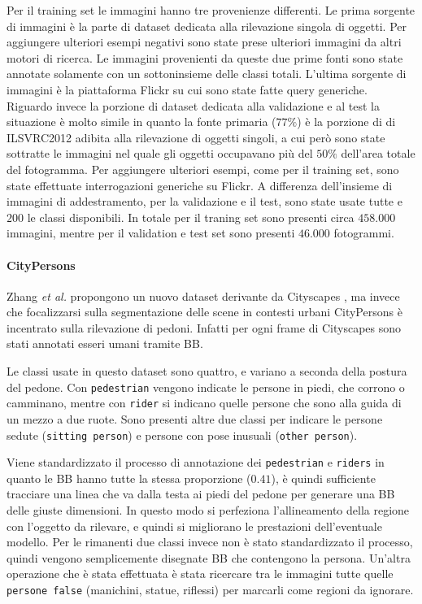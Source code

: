 Per il training set le immagini hanno tre provenienze differenti. Le prima sorgente di immagini è la parte di dataset dedicata alla rilevazione singola di oggetti. Per aggiungere ulteriori esempi negativi sono state prese ulteriori immagini da altri motori di ricerca. Le immagini provenienti da queste due prime fonti sono state annotate solamente con un sottoninsieme delle classi totali. L'ultima sorgente di immagini è la piattaforma Flickr su cui sono state fatte query generiche. 
Riguardo invece la porzione di dataset dedicata alla validazione e al test la situazione è molto simile in quanto la fonte primaria ($77\%$) è la porzione di di \ac{ILSVRC}2012 adibita alla rilevazione di oggetti singoli, a cui però sono state sottratte le immagini nel quale gli oggetti occupavano più del $50\%$ dell'area totale del fotogramma. Per aggiungere ulteriori esempi, come per il training set, sono state effettuate interrogazioni generiche su Flickr. A differenza dell'insieme di immagini di addestramento, per la validazione e il test, sono state usate tutte e $200$ le classi disponibili. 
In totale per il traning set sono presenti circa $458.000$ immagini, mentre per il validation e test set sono presenti $46.000$ fotogrammi. 
\paragraph{CityPersons} Zhang \textit{et al. } \cite{zhang2017citypersons} propongono un nuovo dataset derivante da Cityscapes \cite{cordts2016cityscapes}, ma invece che focalizzarsi sulla segmentazione delle scene in contesti urbani CityPersons è incentrato sulla rilevazione di pedoni. Infatti per ogni frame di Cityscapes sono stati annotati esseri umani tramite \ac{BB}.

Le classi usate in questo dataset sono quattro, e variano a seconda della postura del pedone. Con \texttt{pedestrian} vengono indicate le persone in piedi, che corrono o camminano, mentre con \texttt{rider} si indicano quelle persone che sono alla guida di un mezzo a due ruote. Sono presenti altre due classi per indicare le persone sedute (\texttt{sitting person}) e persone con pose inusuali (\texttt{other person}).

Viene standardizzato il processo di annotazione dei \texttt{pedestrian} e \texttt{riders} in quanto le \ac{BB} hanno tutte la stessa proporzione ($0.41$), è quindi sufficiente tracciare una linea che va dalla testa ai piedi del pedone per generare una \ac{BB} delle giuste dimensioni. In questo modo si perfeziona l'allineamento della regione con l'oggetto da rilevare, e quindi si migliorano le prestazioni dell'eventuale modello. 
Per le rimanenti due classi invece non è stato standardizzato il processo, quindi vengono semplicemente disegnate \ac{BB} che contengono la persona. Un'altra operazione che è stata effettuata è stata ricercare tra le immagini tutte quelle \texttt{persone false} (manichini, statue, riflessi) per marcarli come regioni da ignorare. 

